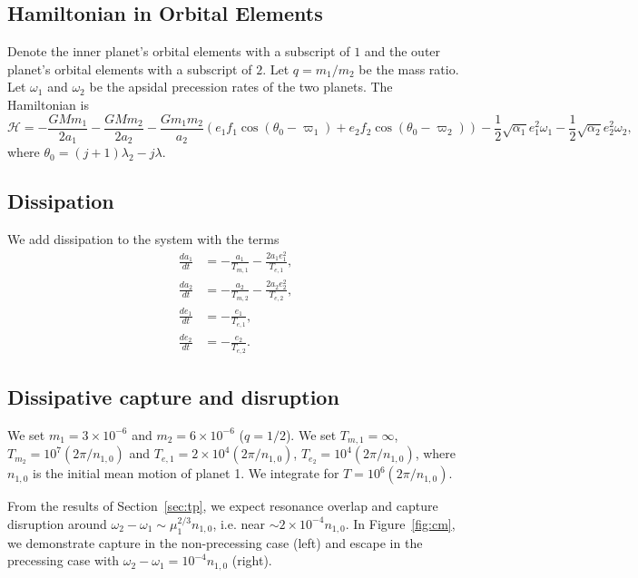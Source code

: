 \documentclass{article}
\begin{document}
\subsection{Hamiltonian in Orbital Elements}
Denote the inner planet's orbital elements with a subscript of $1$ and the outer planet's orbital elements with a subscript of $2$.
Let $q=m_1/m_2$ be the mass ratio.
Let $\omega_1$ and $\omega_2$ be the apsidal precession rates of the two planets.
The Hamiltonian is
\begin{equation}
    \mathcal H=
    - \frac{G M m_{1}}{2 a_{1}}
    - \frac{G M m_{2}}{2 a_{2}}
    - \frac{G m_{1}m_2}{a_{2}} \left(e_{1} f_{1} \cos(\theta_0 - \varpi_1) + e_{2} f_{2} \cos(\theta_0-\varpi_2)\right)
    - \frac12\sqrt{\alpha_1}e_1^2\omega_1
    - \frac12\sqrt{\alpha_2}e_2^2\omega_2,
\end{equation}
where $\theta_0 = (j+1)\lambda_2-j\lambda$.

\subsection{Dissipation}
We add dissipation to the system with the terms
\begin{align}
    \frac{da_1}{dt} & =- \frac{a_{1}}{T_{m,1}} - \frac{2 a_{1} e_{1}^{2}}{T_{e,1}}, \\
    \frac{da_2}{dt} & =- \frac{a_{2}}{T_{m,2}} - \frac{2 a_{2} e_{2}^{2}}{T_{e,2}}, \\
    \frac{de_1}{dt} & =- \frac{e_{1}}{T_{e,1}},                                     \\
    \frac{de_2}{dt} & =- \frac{e_{2}}{T_{e,2}}.
\end{align}

\subsection{Dissipative capture and disruption}
We set $m_1=3\times10^{-6}$ and $m_2=6\times 10^{-6}$ ($q=1/2$).
We set $T_{m,1}=\infty$, $T_{m_2} = 10^{7}(2\pi/n_{1,0})$ and $T_{e,1} = 2\times10^4(2\pi/n_{1,0})$, $T_{e_2} = 10^4(2\pi/n_{1,0})$, where $n_{1,0}$ is the initial mean motion of planet 1.
We integrate for $T=10^6(2\pi/n_{1,0})$.

From the results of Section~\ref{sec:tp}, we expect resonance overlap and capture disruption around $\omega_2-\omega_1\sim\mu_1^{2/3}n_{1,0}$, i.e. near $\sim 2\times10^{-4}n_{1,0}$.
In Figure~\ref{fig:cm}, we demonstrate capture in the non-precessing case (left) and escape in the precessing case with $\omega_2-\omega_1=10^{-4}n_{1,0}$ (right).
\end{document}
